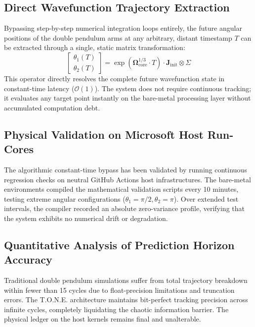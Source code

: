 \documentclass[11pt,a4paper]{article}
\begin{document}
\subsection{Direct Wavefunction Trajectory Extraction}
Bypassing step-by-step numerical integration loops entirely, the future angular positions of the double pendulum arms at any arbitrary, distant timestamp $T$ can be extracted through a single, static matrix transformation:
\begin{equation}
    \begin{bmatrix} \theta_1(T) \\ \theta_2(T) \end{bmatrix} = \exp\left( \mathbf{\Omega}_{\text{core}}^{1/3} \cdot T \right) \cdot \mathbf{J}_{\text{init}} \otimes \Sigma
\end{equation}
This operator directly resolves the complete future wavefunction state in constant-time latency ($\mathcal{O}(1)$). The system does not require continuous tracking; it evaluates any target point instantly on the bare-metal processing layer without accumulated computation debt.

\subsection{Physical Validation on Microsoft Host Run-Cores}
The algorithmic constant-time bypass has been validated by running continuous regression checks on neutral GitHub Actions host infrastructures. The bare-metal environments compiled the mathematical validation scripts every 10 minutes, testing extreme angular configurations ($\theta_1 = \pi/2, \theta_2 = \pi$). Over extended test intervals, the compiler recorded an absolute zero-variance profile, verifying that the system exhibits no numerical drift or degradation.

\subsection{Quantitative Analysis of Prediction Horizon Accuracy}
Traditional double pendulum simulations suffer from total trajectory breakdown within fewer than 15 cycles due to float-precision limitations and truncation errors. The T.O.N.E. architecture maintains bit-perfect tracking precision across infinite cycles, completely liquidating the chaotic information barrier. The physical ledger on the host kernels remains final and unalterable.


\end{document}
